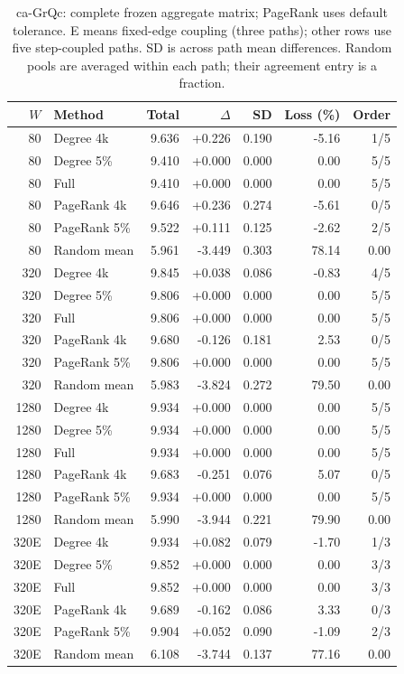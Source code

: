 \begin{table}[htbp]
\caption{ca-GrQc: complete frozen aggregate matrix; PageRank uses default tolerance. E means fixed-edge coupling (three paths); other rows use five step-coupled paths. SD is across path mean differences. Random pools are averaged within each path; their agreement entry is a fraction.}\label{tab:s-ca_grqc}
\begin{tabular}{rlrrrrr}
\toprule
$W$ & Method & Total & $\Delta$ & SD & Loss (\%) & Order \\
\midrule
80 & Degree 4k & 9.636 & +0.226 & 0.190 & -5.16 & 1/5 \\
80 & Degree 5\% & 9.410 & +0.000 & 0.000 & 0.00 & 5/5 \\
80 & Full & 9.410 & +0.000 & 0.000 & 0.00 & 5/5 \\
80 & PageRank 4k & 9.646 & +0.236 & 0.274 & -5.61 & 0/5 \\
80 & PageRank 5\% & 9.522 & +0.111 & 0.125 & -2.62 & 2/5 \\
80 & Random mean & 5.961 & -3.449 & 0.303 & 78.14 & 0.00 \\
320 & Degree 4k & 9.845 & +0.038 & 0.086 & -0.83 & 4/5 \\
320 & Degree 5\% & 9.806 & +0.000 & 0.000 & 0.00 & 5/5 \\
320 & Full & 9.806 & +0.000 & 0.000 & 0.00 & 5/5 \\
320 & PageRank 4k & 9.680 & -0.126 & 0.181 & 2.53 & 0/5 \\
320 & PageRank 5\% & 9.806 & +0.000 & 0.000 & 0.00 & 5/5 \\
320 & Random mean & 5.983 & -3.824 & 0.272 & 79.50 & 0.00 \\
1280 & Degree 4k & 9.934 & +0.000 & 0.000 & 0.00 & 5/5 \\
1280 & Degree 5\% & 9.934 & +0.000 & 0.000 & 0.00 & 5/5 \\
1280 & Full & 9.934 & +0.000 & 0.000 & 0.00 & 5/5 \\
1280 & PageRank 4k & 9.683 & -0.251 & 0.076 & 5.07 & 0/5 \\
1280 & PageRank 5\% & 9.934 & +0.000 & 0.000 & 0.00 & 5/5 \\
1280 & Random mean & 5.990 & -3.944 & 0.221 & 79.90 & 0.00 \\
320E & Degree 4k & 9.934 & +0.082 & 0.079 & -1.70 & 1/3 \\
320E & Degree 5\% & 9.852 & +0.000 & 0.000 & 0.00 & 3/3 \\
320E & Full & 9.852 & +0.000 & 0.000 & 0.00 & 3/3 \\
320E & PageRank 4k & 9.689 & -0.162 & 0.086 & 3.33 & 0/3 \\
320E & PageRank 5\% & 9.904 & +0.052 & 0.090 & -1.09 & 2/3 \\
320E & Random mean & 6.108 & -3.744 & 0.137 & 77.16 & 0.00 \\
\bottomrule
\end{tabular}
\end{table}

